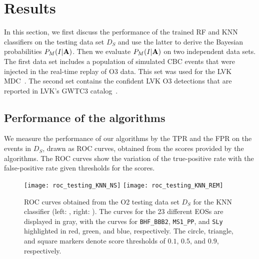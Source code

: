 \section{Results} \label{results}

In this section, we first discuss the performance of the trained \ac{RF} and \ac{KNN} classifiers on the testing data set $D_S$ and use the latter to derive the Bayesian probabilities $P_M(I|{\bf
A})$. Then we evaluate $P_M(I|{\bf A})$ on two independent data sets. The first data set includes a population of simulated \ac{CBC} events that were injected in the real-time replay of \ac{O3} data. This set was used for the \ac{LVK} \ac{MDC}~\cite{Chaudhary:2023vec}. The second set contains the confident \ac{LVK} \ac{O3} detections that are reported in \ac{LVK}'s \ac{GWTC3}
catalog~\cite{LIGOScientific:2021djp}.

\subsection{Performance of the algorithms}

We measure the performance of our algorithms by the \ac{TPR} and the \ac{FPR} on the events in $D_S$, drawn as \ac{ROC} curves, obtained from the scores provided by the algorithms. The \ac{ROC} curves show the variation of the true-positive rate with the false-positive rate given thresholds for the scores.  

\begin{figure}[h]
\texttt{[image: roc\_testing\_KNN\_NS]}
\texttt{[image: roc\_testing\_KNN\_REM]}
\caption{\ac{ROC} curves obtained from the \ac{O2} testing data set $D_S$ for the \ac{KNN} classifier (left: \hasns, right: \hasrem). The curves for the 23 different \ac{EOS}s are displayed in
gray, with the curves for {\tt BHF\_BBB2}, {\tt MS1\_PP}, and {\tt SLy} highlighted in red, green, and blue, respectively. The circle, triangle, and square markers denote score thresholds of
$0.1$, $0.5$, and $0.9$, respectively.}
\label{fig:rocO2_KNN}
\end{figure}

